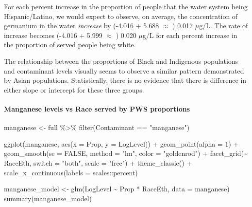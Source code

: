 \documentclass[
  letterpaper,
  DIV=11,
  numbers=noendperiod]{scrartcl}
\let\oldparagraph\paragraph
\renewcommand{\paragraph}[1]{\oldparagraph{#1}\mbox{}}
\newenvironment{Shaded}{\begin{snugshade}}{\end{snugshade}}
\newcommand{\AttributeTok}[1]{\textcolor[rgb]{0.40,0.45,0.13}{#1}}
\newcommand{\ConstantTok}[1]{\textcolor[rgb]{0.56,0.35,0.01}{#1}}
\newcommand{\DecValTok}[1]{\textcolor[rgb]{0.68,0.00,0.00}{#1}}
\newcommand{\FunctionTok}[1]{\textcolor[rgb]{0.28,0.35,0.67}{#1}}
\newcommand{\NormalTok}[1]{\textcolor[rgb]{0.00,0.23,0.31}{#1}}
\newcommand{\OtherTok}[1]{\textcolor[rgb]{0.00,0.23,0.31}{#1}}
\newcommand{\SpecialCharTok}[1]{\textcolor[rgb]{0.37,0.37,0.37}{#1}}
\newcommand{\StringTok}[1]{\textcolor[rgb]{0.13,0.47,0.30}{#1}}
\begin{document}
For each percent increase in the proportion of people that the water
system being Hispanic/Latino, we would expect to observe, on average,
the concentration of germanium in the water \emph{increase} by (-4.016 +
5.688 \(\approx\) ) 0.017 \(\mu\)g/L. The rate of increase becomes
(-4.016 + 5.999 \(\approx\) ) 0.020 \(\mu\)g/L for each percent increase
in the proportion of served people being white.

The relationship between the proportions of Black and Indigenous
populations and contaminant levels visually seems to observe a similar
pattern demonstrated by Asian populations. Statistically, there is no
evidence that there is difference in either slope or intercept for these
three groups.

\hypertarget{manganese-levels-vs-race-served-by-pws-proportions}{%
\paragraph{Manganese levels vs Race served by PWS
proportions}\label{manganese-levels-vs-race-served-by-pws-proportions}}

\begin{Shaded}
\begin{Highlighting}[]
\NormalTok{manganese }\OtherTok{\textless{}{-}}\NormalTok{ full }\SpecialCharTok{\%\textgreater{}\%} 
  \FunctionTok{filter}\NormalTok{(Contaminant }\SpecialCharTok{==} \StringTok{"manganese"}\NormalTok{)}

\FunctionTok{ggplot}\NormalTok{(manganese, }\FunctionTok{aes}\NormalTok{(}\AttributeTok{x =}\NormalTok{ Prop, }\AttributeTok{y =}\NormalTok{ LogLevel)) }\SpecialCharTok{+}
  \FunctionTok{geom\_point}\NormalTok{(}\AttributeTok{alpha =} \DecValTok{1}\NormalTok{) }\SpecialCharTok{+}
  \FunctionTok{geom\_smooth}\NormalTok{(}\AttributeTok{se =} \ConstantTok{FALSE}\NormalTok{, }\AttributeTok{method =} \StringTok{"lm"}\NormalTok{, }\AttributeTok{color =} \StringTok{"goldenrod"}\NormalTok{) }\SpecialCharTok{+}
  \FunctionTok{facet\_grid}\NormalTok{(}\SpecialCharTok{\textasciitilde{}}\NormalTok{ RaceEth, }\AttributeTok{switch =} \StringTok{"both"}\NormalTok{, }\AttributeTok{scale =} \StringTok{"free"}\NormalTok{) }\SpecialCharTok{+}
  \FunctionTok{theme\_classic}\NormalTok{() }\SpecialCharTok{+}
  \FunctionTok{scale\_x\_continuous}\NormalTok{(}\AttributeTok{labels =}\NormalTok{ scales}\SpecialCharTok{::}\NormalTok{percent)}

\NormalTok{manganese\_model }\OtherTok{\textless{}{-}} \FunctionTok{glm}\NormalTok{(LogLevel }\SpecialCharTok{\textasciitilde{}}\NormalTok{ Prop }\SpecialCharTok{*}\NormalTok{ RaceEth, }\AttributeTok{data =}\NormalTok{ manganese)}
\FunctionTok{summary}\NormalTok{(manganese\_model)}
\end{Highlighting}
\end{Shaded}
\end{document}
